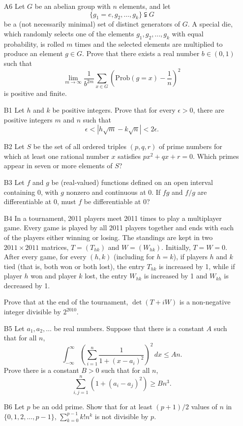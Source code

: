 \documentclass[amssymb,twocolumn]{revtex4}
\begin{document}
\begin{itemize}
\item[A6]
Let $G$ be an abelian group with $n$ elements, and let 
\[
\{g_1=e,g_2,\dots,g_k\} \subsetneqq G
\]
be a (not necessarily minimal) set of distinct generators of $G$. A special die, which randomly selects one of the elements $g_1,g_2,...,g_k$ with equal probability, is rolled $m$ times and the selected elements are multiplied to produce an element $g \in G$. 
Prove that there exists a real number $b \in (0,1)$ such that
\[
\lim_{m\to\infty} \frac{1}{b^{2m}} \sum_{x\in G} \left(\mathrm{Prob}(g=x) - \frac{1}{n}\right)^2
\]
is positive and finite. 

\item[B1]
Let $h$ and $k$ be positive integers. Prove that for every $\epsilon > 0$, there are positive integers $m$
and $n$ such that
\[
\epsilon < |h \sqrt{m} - k \sqrt{n}| < 2\epsilon.
\]

\item[B2]
Let $S$ be the set of all ordered triples $(p,q,r)$ of prime numbers for which at least one rational number $x$
satisfies $px^2 + qx + r =0$. Which primes appear in seven or more elements of $S$?

\item[B3]
Let $f$ and $g$ be (real-valued) functions 
defined on an open interval containing $0$, with $g$ nonzero and continuous at $0$.
If $fg$ and $f/g$ are differentiable at $0$, must $f$ be differentiable at 0?
 
\item[B4]
In a tournament, 2011 players meet 2011 times to play a multiplayer game. Every game is played by all 2011 players
together and ends with each of the players either winning or losing. The standings are kept in two 
$2011 \times 2011$ matrices, $T = (T_{hk})$ and $W = (W_{hk})$. Initially, $T=W=0$. After every game,
for every $(h,k)$ (including for $h=k$), if players $h$ and $k$ tied (that is, both won or both lost),
the entry $T_{hk}$ is increased by 1, while if player $h$ won and player $k$ lost, the
entry $W_{hk}$ is increased by 1 and $W_{kh}$ is decreased by 1.

Prove that at the end of the tournament, $\det(T+iW)$ is a non-negative integer divisible by $2^{2010}$.

\item[B5]
Let $a_1, a_2, \dots$ be real numbers. Suppose that there is a constant $A$ such that for all $n$,
\[
\int_{-\infty}^\infty \left( \sum_{i=1}^n \frac{1}{1 + (x-a_i)^2} \right)^2\,dx \leq An.
\]
Prove there is a constant $B>0$ such that for all $n$,
\[
\sum_{i,j=1}^n (1 + (a_i - a_j)^2) \geq Bn^3.
\]
 
\item[B6]
Let $p$ be an odd prime. Show that for at least $(p+1)/2$ values of $n$ in $\{0,1,2,\dots,p-1\}$,
$\sum_{k=0}^{p-1} k! n^k$
is not divisible by $p$. 

\end{itemize}
\end{document}
